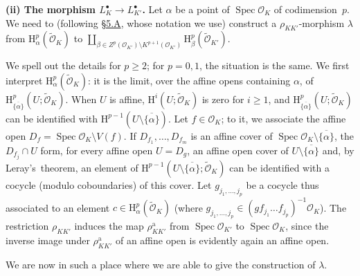 \documentclass[british]{article}
\newenvironment{rmenv}[1]
  {\phantomsection\par\smallskip\noindent\textbf{#1.}\rmfamily}
  {\par\smallskip}
\newcommand{\oldpage}[1]{\marginpar{\footnotesize$\Big\vert$ \textit{p.~#1}}}
\begin{document}
\protect{}\label{section-5.b.ii}
\begin{rmenv}{(ii) The morphism $L_K^\bullet\to L_{K'}^\bullet$}
Let \(\alpha\) be a point of \(\operatorname{Spec}{{\mathscr{O}}_K}\) of
codimension~\(p\). We need to (following \hyperref[section-5.a]{§5.A},
whose notation we use) construct a \(\rho_{KK'}\)-morphism \(\lambda\)
from \(\mathrm{H}_\alpha^p(\widetilde{{\mathscr{O}}}_K)\) to
\(\coprod_{\beta\in Z^p({\mathscr{O}}_{K'})\setminus K^{p+1}({\mathscr{O}}_{K'})} \mathrm{H}_\beta^p(\widetilde{{\mathscr{O}}}_{K'}).\)

We spell out the details for \(p\geqslant2\); for \(p=0,1\), the
situation is the same. We first interpret
\(\mathrm{H}_\alpha^p(\widetilde{{\mathscr{O}}}_K)\): it is the limit,
over the affine opens containing \(\alpha\), of
\(\mathrm{H}_{\overline{\{\alpha\}}}^p(U;\widetilde{{\mathscr{O}}}_K)\).
\oldpage{88} When \(U\) is affine,
\(\mathrm{H}^i(U;\widetilde{{\mathscr{O}}}_K)\) is zero for
\(i\geqslant1\), and
\(\mathrm{H}_{\overline{\{\alpha\}}}^p(U;\widetilde{{\mathscr{O}}}_K)\)
can be identified with
\(\mathrm{H}^{p-1}(U\setminus\overline{\{\alpha\}})\). Let
\(f\in{\mathscr{O}}_K\); to it, we associate the affine open
\(D_f=\operatorname{Spec}{{\mathscr{O}}_K}\setminus V(f)\). If
\(D_{f_1},\ldots,D_{f_m}\) is an affine cover of
\(\operatorname{Spec}{{\mathscr{O}}_K}\setminus\overline{\{\alpha\}}\),
the \(D_{f_j}\cap U\) form, for every affine open \(U=D_g\), an affine
open cover of \(U\setminus\overline{\{\alpha\}}\) and, by
Leray's~theorem, an element of
\(\mathrm{H}^{p-1}(U\setminus\overline{\{\alpha\}};\widetilde{{\mathscr{O}}}_K)\)
can be identified with a cocycle (modulo coboundaries) of this cover.
Let \(g_{j_1,\ldots,j_p}\) be a cocycle thus associated to an element
\(c\in\mathrm{H}_\alpha^p(\widetilde{{\mathscr{O}}}_K)\) (where
\(g_{j_1,\ldots,j_p}\in(gf_{j_1}\ldots f_{j_p})^{-1}{\mathscr{O}}_K\)).
The restriction \(\rho_{KK'}\) induces the map \(\rho_{KK'}^\mathrm{a}\)
from \(\operatorname{Spec}{{\mathscr{O}}_{K'}}\) to
\(\operatorname{Spec}{{\mathscr{O}}_K}\), since the inverse image under
\(\rho_{KK'}^\mathrm{a}\) of an affine open is evidently again an affine
open.

We are now in such a place where we are able to give the construction of
\(\lambda\).


\end{rmenv}
\end{document}
